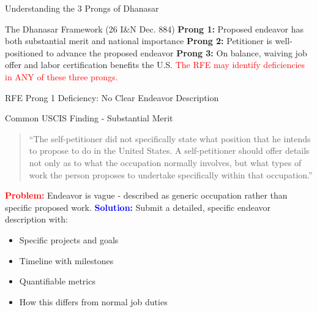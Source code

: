 \documentclass[11pt]{beamer}
\begin{document}
	\begin{frame}{Understanding the 3 Prongs of Dhanasar}
		\scriptsize
		\begin{block}{The Dhanasar Framework (26 I\&N Dec. 884)}
			\textbf{Prong 1:} Proposed endeavor has both substantial merit and national importance
			\vspace{0.2cm}
			\textbf{Prong 2:} Petitioner is well-positioned to advance the proposed endeavor
			\vspace{0.2cm}
			\textbf{Prong 3:} On balance, waiving job offer and labor certification benefits the U.S.
			\vspace{0.2cm}
			\textcolor{red}{The RFE may identify deficiencies in ANY of these three prongs.}
		\end{block}
	\end{frame}
	
	
	
	
	
	
	\begin{frame}{RFE Prong 1 Deficiency: No Clear Endeavor Description}
		\scriptsize
		\begin{block}{Common USCIS Finding - Substantial Merit}
			\begin{quote}
				``The self-petitioner did not specifically state what position that he intends to propose to do in the United States. A self-petitioner should offer details not only as to what the occupation normally involves, but what types of work the person proposes to undertake specifically within that occupation.''
			\end{quote}
			\textcolor{red}{\textbf{Problem:}} Endeavor is vague - described as generic occupation rather than specific proposed work.
			\vspace{0.2cm}
			\textcolor{blue}{\textbf{Solution:}} Submit a detailed, specific endeavor description with:
			\begin{itemize}
				\item Specific projects and goals
				\item Timeline with milestones
				\item Quantifiable metrics
				\item How this differs from normal job duties
			\end{itemize}
		\end{block}
	\end{frame}
	
\end{document}
